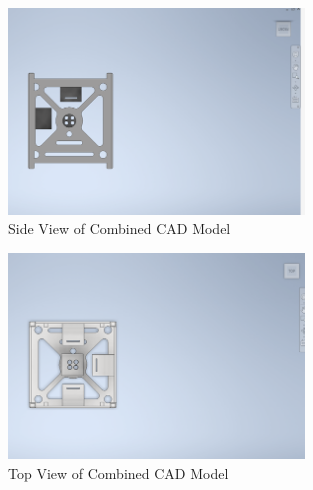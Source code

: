                     \begin{figure}[htbp]
                        \centering
                        \includegraphics[width=0.7\textwidth]{figures/Appendix-CAD/CombinedSide.png}
                        \caption*{Side View of Combined CAD Model} 
                        \label{fig:CubeCombine2}
                        \end{figure}
    
                        \begin{figure}[htbp]
                            \centering
                            \includegraphics[width=0.7\textwidth]{figures/Appendix-CAD/CombinedTop.png}
                            \caption*{Top View of Combined CAD Model} 
                            \label{fig:CubeCombine3}
                            \end{figure}
                        
                
            
      

                        
